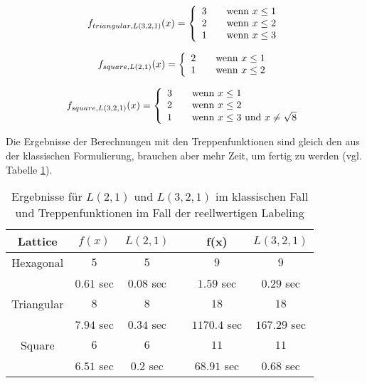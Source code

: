 \documentclass[
	fontsize=12pt,
	paper=a4,
	twoside=false,
	numbers=noenddot,
	plainheadsepline,
	toc=listof,
	toc=bibliography
]{scrartcl}
\begin{document}
\[ f_{triangular,L(3,2,1)}(x) = \left\{
  \begin{array}{l l}
    3 & \quad \text{wenn $x\le 1$}\\
    2 & \quad \text{wenn $x\le 2$}\\
    1 & \quad \text{wenn $x\le 3$}
  \end{array} \right.\]

\[ f_{square,L(2,1)}(x) = \left\{
  \begin{array}{l l}
    2 & \quad \text{wenn $x\le 1$}\\
    1 & \quad \text{wenn $x\le 2$}
  \end{array} \right.\]

\[ f_{square,L(3,2,1)}(x) = \left\{
  \begin{array}{l l}
    3 & \quad \text{wenn $x\le 1$}\\
    2 & \quad \text{wenn $x\le 2$}\\
    1 & \quad \text{wenn $x\le 3$ und $x\neq\sqrt{8}$}
  \end{array} \right.\]

Die Ergebnisse der Berechnungen mit den Treppenfunktionen sind gleich den aus der klassischen Formulierung, brauchen aber mehr Zeit, um fertig zu werden (vgl. Tabelle \ref{Table3}).

\begin{table}[htbp]
\centering
  \begin{tabular}{|c|c|c|c|c|c|}
    \hline
    Lattice& $f(x)$  & $L(2,1)$ & & f(x) & $L(3,2,1)$ \\ \hline
    Hexagonal	& $5$ & $5$ & & $9$ & $9$ \\
			& $0.61$ sec	& $0.08$ sec & & $1.59$ sec & $0.29$ sec\\ \hline
    Triangular	& $8$ & $8$ & & $18$ &  $18$\\
			& $7.94$ sec & $0.34$ sec & & $1170.4$ sec & $167.29$ sec \\ \hline
    Square	& $6$ & $6$ & & $11$ & $11$\\
			& $6.51$ sec & $0.2$ sec & & $68.91$ sec & $0.68$ sec\\   \hline
  \end{tabular}
\caption{Ergebnisse für $L(2,1)$ und $L(3,2,1)$ im klassischen Fall und Treppenfunktionen im Fall der reellwertigen Labeling}
\label{Table3}
\end{table}
\end{document}
